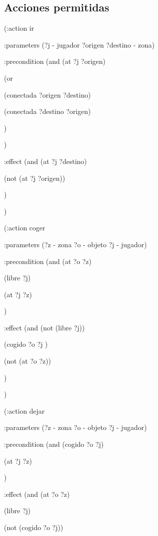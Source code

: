 \documentclass[a4paper, 11pt]{article}
\begin{document}
	\subsection{Acciones permitidas}
		   (:action ir

		      :parameters (?j - jugador ?origen ?destino - zona)

		      :precondition (and (at ?j ?origen)

		                         (or

		                            (conectada ?origen ?destino)

		                            (conectada ?destino ?origen)

		                         )

		                    )

		      :effect (and (at ?j ?destino)

		                   (not (at ?j ?origen))

		              )

		   )

		

		   (:action coger

		      :parameters (?z - zona ?o - objeto ?j - jugador)

		      :precondition (and (at ?o ?z)

		                         (libre ?j)

		                         (at ?j ?z)

		                    )

		      :effect (and (not (libre ?j))

		                   (cogido ?o ?j )

		                   (not (at ?o ?z))

		              )

		   )

		

		   (:action dejar

		      :parameters (?z - zona ?o - objeto ?j - jugador)

		      :precondition (and (cogido ?o ?j)

		                         (at ?j ?z)

		                    )

		      :effect (and (at ?o ?z)

		                   (libre ?j)

		                   (not (cogido ?o ?j))
\end{document}
